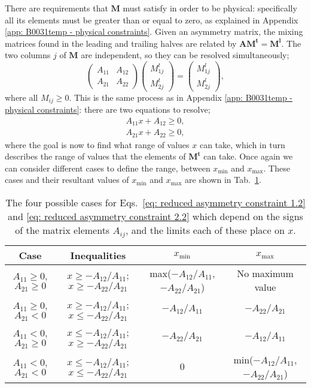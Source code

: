 There are requirements that $\mathbf{M}$ must satisfy in order to be physical: specifically all its elements must be greater than or equal to zero, as explained in Appendix \ref{app: B0031temp - physical constraints}. Given an asymmetry matrix, the mixing matrices found in the leading and trailing halves are related by $\mathbf{AM^t}=\mathbf{M^l}$. The two columns $j$ of $\mathbf{M}$ are independent, so they can be resolved simultaneously;
\begin{equation}
    \begin{pmatrix} A_{11} & A_{12} \\ A_{21} & A_{22} \end{pmatrix} \begin{pmatrix} M^t_{1j} \\ M^t_{2j} \end{pmatrix} = \begin{pmatrix} M^l_{1j} \\ M^l_{2j} \end{pmatrix},
\end{equation}
where all $M_{ij}\geq 0$. This is the same process as in Appendix \ref{app: B0031temp - physical constraints}: there are two equations to resolve;
\begin{align}
    A_{11}x + A_{12} \geq 0,\label{eq: reduced asymmetry constraint 1.2}\\
    A_{21}x + A_{22} \geq 0,\label{eq: reduced asymmetry constraint 2.2}
\end{align}
where the goal is now to find what range of values $x$ can take, which in turn describes the range of values that the elements of $\mathbf{M^t}$ can take. Once again we can consider different cases to define the range, between $x_\mathrm{min}$ and $x_\mathrm{max}$. These cases and their resultant values of $x_\mathrm{min}$ and $x_\mathrm{max}$ are shown in  Tab.~\ref{tab: asymmetry constraint cases}.
\begin{table}
    \caption[B0031 Geometry constraints TEMP]{The four possible cases for Eqs.~\eqref{eq: reduced asymmetry constraint 1.2} and \eqref{eq: reduced asymmetry constraint 2.2} which depend on the signs of the matrix elements $A_{ij}$, and the limits each of these place on $x$.}
    \label{tab: asymmetry constraint cases}
    \begin{tabular}{cccc}
        \hline
        Case 							& Inequalities 									& $x_\mathrm{min}$ 							& $x_\mathrm{max}$ \\
        \hline
        $A_{11}\geq0$, $A_{21}\geq0$	& $x\geq-A_{12}/A_{11}$; $x\geq-A_{22}/A_{21}$ 	& max($-A_{12}/A_{11}$,$-A_{22}/A_{21}$)	& No maximum value                			\\
        $A_{11}\geq0$, $A_{21}<0$    	& $x\geq-A_{12}/A_{11}$; $x\leq-A_{22}/A_{21}$ 	& $-A_{12}/A_{11}$							& $-A_{22}/A_{21}$                          \\
        $A_{11}<0$, $A_{21}\geq0$    	& $x\leq-A_{12}/A_{11}$; $x\geq-A_{22}/A_{21}$ 	& $-A_{22}/A_{21}$							& $-A_{12}/A_{11}$                          \\
        $A_{11}<0$, $A_{21}<0$       	& $x\leq-A_{12}/A_{11}$; $x\leq-A_{22}/A_{21}$ 	& 0											& min($-A_{12}/A_{11}$,$-A_{22}/A_{21}$)
    \end{tabular}
\end{table}
